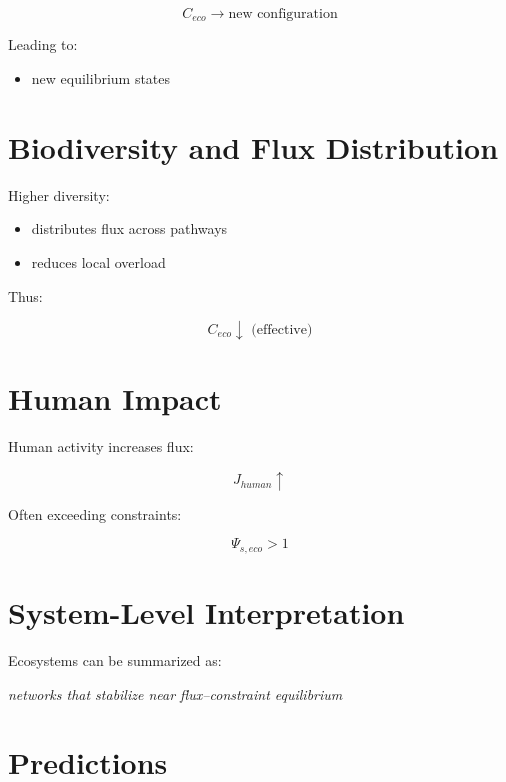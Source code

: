 \documentclass[11pt]{article}
\begin{document}
\begin{equation}
C_{eco} \rightarrow \text{new configuration}
\end{equation}

Leading to:

\begin{itemize}
    \item new equilibrium states
\end{itemize}

\section{Biodiversity and Flux Distribution}

Higher diversity:

\begin{itemize}
    \item distributes flux across pathways
    \item reduces local overload
\end{itemize}

Thus:

\begin{equation}
C_{eco} \downarrow \text{ (effective)}
\end{equation}

\section{Human Impact}

Human activity increases flux:

\begin{equation}
J_{human} \uparrow
\end{equation}

Often exceeding constraints:

\begin{equation}
\Psi_{s,eco} > 1
\end{equation}

\section{System-Level Interpretation}

Ecosystems can be summarized as:

\begin{center}
\textit{networks that stabilize near flux–constraint equilibrium}
\end{center}

\section{Predictions}
\end{document}
